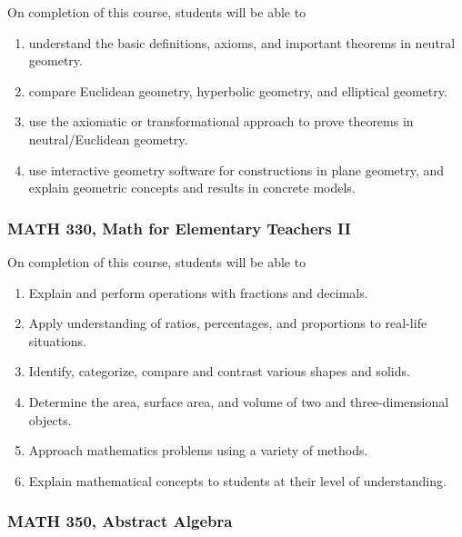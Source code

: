 \documentclass[11pt]{article}
\newenvironment{alphalist}{
\begin{enumerate}[label=(\arabic*),widest=107 ,leftmargin=25pt, itemsep=0pt]}
{\end{enumerate}}
\begin{document}
On completion of this course, students will be able to
\begin{alphalist}
    \item understand the basic definitions, axioms, and important theorems in neutral geometry.
    \item compare Euclidean geometry, hyperbolic geometry, and elliptical geometry.
    \item use the axiomatic or transformational approach to prove theorems in neutral/Euclidean geometry.
    \item use interactive geometry software for constructions in plane geometry, and
    explain geometric concepts and results in concrete models.
\end{alphalist}

\subsubsection{MATH 330, Math for Elementary Teachers II}

On completion of this course, students will be able to
\begin{alphalist}
\item Explain and perform operations with fractions and decimals. 
\item Apply understanding of ratios, percentages, and proportions to real-life situations. 
\item Identify, categorize, compare and contrast various shapes and solids. 
\item Determine the area, surface area, and volume of two and three-dimensional objects. 
\item Approach mathematics problems using a variety of methods. 
\item Explain mathematical concepts to students at their level of understanding.
\end{alphalist}

\subsubsection{MATH 350,  Abstract Algebra}
\end{document}
